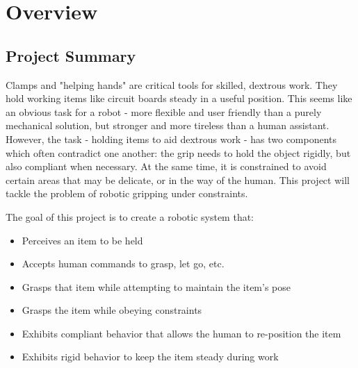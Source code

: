 \documentclass[10pt]{article}
\begin{document}
\section{Overview} \label{sec:overview}
\subsection*{Project Summary}
\par Clamps and "helping hands" are critical tools for skilled, dextrous work. They hold working items like circuit boards steady in a useful position. This seems like an obvious task for a robot - more flexible and user friendly than a purely mechanical solution, but stronger and more tireless than a human assistant. However, the task - holding items to aid dextrous work - has two components which often contradict one another: the grip needs to hold the object rigidly, but also compliant when necessary. At the same time, it is constrained to avoid certain areas that may be delicate, or in the way of the human. This project will tackle the problem of robotic gripping under constraints.
\par The goal of this project is to create a robotic system that:
\begin{itemize}


\item Perceives an item to be held
\item Accepts human commands to grasp, let go, etc.
\item Grasps that item while attempting to maintain the item's pose
\item Grasps the item while obeying constraints
\item Exhibits compliant behavior that allows the human to re-position the item 
\item Exhibits rigid behavior to keep the item steady during work
\end{itemize}
\end{document}
